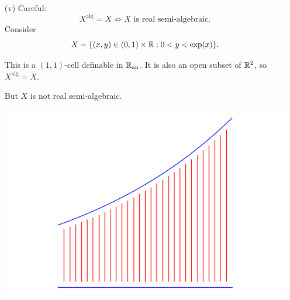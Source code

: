 \documentclass{beamer}
\begin{document}
\begin{frame}
  \begin{example}[Continued]
    \begin{enumerate}
    \item[(v)]
      \alert{Careful:}
      $$X^{\mathrm{alg}}=X\not\Rightarrow X\text{ is real semi-algebraic.}$$
      Consider
      \begin{equation*}
        X = \{(x,y)\in (0,1)\times{\mathbb{R}} : 0<y<\exp(x) \}.
      \end{equation*}
      \begin{minipage}{0.45\linewidth}
        This is a $(1,1)$-cell definable in ${{\mathbb{R}}_{\mathrm{an}}}$.  It is also an open
        subset of ${\mathbb{R}}^2$, so $X^{\mathrm{alg}}=X$.

        But $X$ is \alert{not} real semi-algebraic. 
      \end{minipage}
      \begin{minipage}{0.5\linewidth}
        \includegraphics[width=\textwidth]{expcell.png}
      \end{minipage}
      
    \end{enumerate}
  \end{example}
\end{frame}
\end{document}
